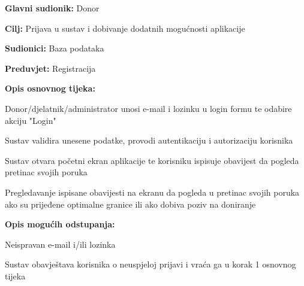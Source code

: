 \eject 
\noindent {}
					\begin{packed_item}
	
						\item \textbf{Glavni sudionik: }Donor
						\item \textbf{Cilj:} Prijava u sustav i dobivanje dodatnih mogućnosti aplikacije
						\item \textbf{Sudionici:} Baza podataka
						\item \textbf{Preduvjet:} Registracija
						\item \textbf{Opis osnovnog tijeka:}
						
						\item[] \begin{packed_enum}
	
							\item Donor/djelatnik/administrator unosi e-mail i lozinku u login formu te odabire akciju "Login"
							\item Sustav validira unesene podatke, provodi autentikaciju i autorizaciju korisnika
							\item Sustav otvara početni ekran aplikacije te korisniku ispisuje obavijest da pogleda pretinac svojih poruka
							\item Pregledavanje ispisane obavijesti na ekranu da pogleda u pretinac svojih poruka ako su prijeđene optimalne granice ili ako dobiva poziv na doniranje
							
						\end{packed_enum}
						\item  \textbf{Opis mogućih odstupanja:}
						
						\item[] \begin{packed_item}
	
							\item[2.a] Neispravan e-mail i/ili lozinka
							\item[] \begin{packed_enum}
								
								\item  Sustav obavještava korisnika o neuspjeloj prijavi i vraća ga u korak 1 osnovnog tijeka

								
							\end{packed_enum}
					\end{packed_item}
					\end{packed_item}
\noindent {}
